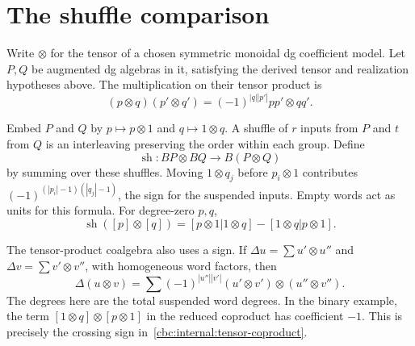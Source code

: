 \section{The shuffle comparison}
Write $\otimes$ for the tensor of a chosen symmetric monoidal dg coefficient model. Let $P,Q$ be augmented dg algebras in it, satisfying the derived tensor and realization hypotheses above. The multiplication on their tensor product is
\[
 (p\otimes q)(p'\otimes q')
   =(-1)^{|q||p'|}pp'\otimes qq'.
\]

Embed $P$ and $Q$ by $p\mapsto p\otimes1$ and $q\mapsto1\otimes q$. A shuffle of $r$ inputs from $P$ and $t$ from $Q$ is an interleaving preserving the order within each group. Define
\begin{equation}\label{cbc:internal:shuffle}
 \operatorname{sh}:BP\otimes BQ\longrightarrow B(P\otimes Q)
\end{equation}
by summing over these shuffles. Moving $1\otimes q_j$ before $p_i\otimes1$ contributes $(-1)^{(|p_i|-1)(|q_j|-1)}$, the sign for the suspended inputs. Empty words act as units for this formula. For degree-zero $p,q$,
\[
 \operatorname{sh}([p]\otimes[q])
 =[p\otimes1|1\otimes q]-[1\otimes q|p\otimes1].
\]

The tensor-product coalgebra also uses a sign. If
$\Delta u=\sum u'\otimes u''$ and $\Delta v=\sum v'\otimes v''$,
with homogeneous word factors, then
\begin{equation}\label{cbc:internal:tensor-coproduct}
 \Delta(u\otimes v)
 =\sum(-1)^{|u''||v'|}
       (u'\otimes v')\otimes(u''\otimes v'').
\end{equation}
The degrees here are the total suspended word degrees. In the binary example, the term $[1\otimes q]\otimes[p\otimes1]$ in the reduced coproduct has coefficient $-1$. This is precisely the crossing sign in~\eqref{cbc:internal:tensor-coproduct}.

